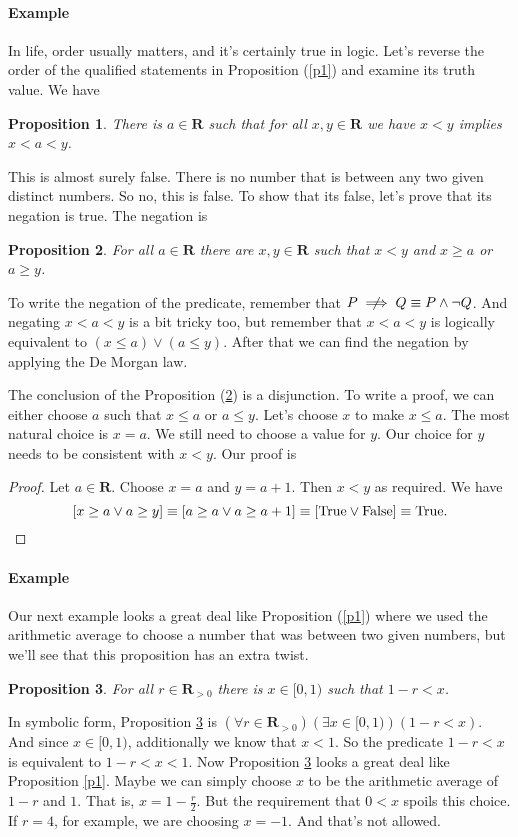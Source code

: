 \documentclass[12pt,fleqn]{article}
\newcommand{\reals}{\mathbf{R}}
\newcommand{\true}{\mathrm{True}}
\newcommand{\false}{\mathrm{False}}
\newcommand{\notimplies}{\centernot\implies}
\newenvironment{myproof}
  {\begin{shaded}\begin{proof}}
  {\end{proof}\end{shaded}}
\newtheorem{prop}{Proposition}
\newcounter{ex}\setcounter{ex}{0}
\newcommand{\ex}{%
\setcounter{ex}{\value{ex}+1}
\paragraph{Example \theex}}
\begin{document}
 \ex In life, order usually matters, and it's certainly true in logic.  Let's reverse the order of the qualified statements in Proposition 
 (\ref{p1}) and examine its truth value. We have 

 \begin{prop}
  There is $a \in \reals$ such that for all $x,y \in \reals$ we have
    $x < y$ implies $x<a<y$. \label{p2}   
\end{prop}
This is almost surely false. There is no number that is between 
any two given distinct numbers. So no, this is false. To show that its false,
let's prove that its negation is true. The negation is

\begin{prop}
  For all $a \in \reals$ there are  $x,y \in \reals$ such that
    $x < y$ and  $x \geq a$ or $a \geq y$. \label{p3} 
\end{prop}
To write the negation of the predicate, remember that
$P \notimplies Q \equiv P \land \lnot Q$. And negating $x<a<y$ is 
a bit tricky too, but remember that 
$x<a<y$ is logically equivalent to $(x \leq a) \lor (a \leq y)$. After that 
we can find the negation by applying the De Morgan law.

The conclusion of the Proposition (\ref{p3}) is a disjunction.
To write a proof, we can either choose $a$ such that $x \leq a$
or $a \leq y$. Let's choose $x$ to make  $x \leq a$. The most
natural choice is $x = a$. We still need to choose a value for $y$.
Our choice for $y$ needs to be consistent with $x < y$. Our proof is

\begin{myproof} Let $a \in \reals$.  Choose $x=a$ and $y=a+1$.
  Then $x < y$ as required. We have
  \begin{equation*}
    \left[x \geq a \lor  a \geq y \right] 
    \equiv \left[a \geq a \lor  a \geq a+1 \right]
    \equiv \left[\true  \lor  \false  \right]
    \equiv \true. \qedhere
  \end{equation*}
\end{myproof}

\ex Our next example looks a great deal like Proposition  (\ref{p1}) where we used the arithmetic average to choose
a number that was between two given numbers,  but we'll see that this proposition has an extra twist.
\begin{prop} 
     For all $r \in \reals_{>0}$ there is $x \in [0,1)$ such that $1-r < x$.  \label{p4}
\end{prop}

In symbolic form, Proposition \ref{p4} is $\left(\forall r  \in \reals_{>0} \right) \left(\exists x \in [0,1)\right) \left (1-r  < x \right)$.
And since $x \in [0,1)$, additionally we know that $x < 1$.  So the predicate $1-r  < x$ is equivalent to $1-r  < x  < 1$. Now Proposition \ref{p4}
looks a great deal like  Proposition \ref{p1}. Maybe we can simply 
choose $x$ to be the arithmetic average of $1-r$ and $1$. That is,
$x = 1 - \frac{r}{2}$.  But the requirement that $0 < x$ spoils this choice. If $r = 4$, for example, we are choosing $x = -1$. And that's 
not allowed.    
\end{document}
